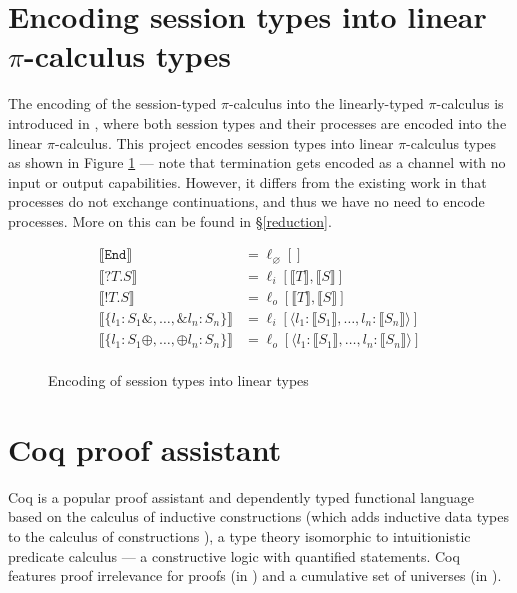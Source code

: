 \documentclass{mproj}
\newcommand{\picalc}{$\pi$-calculus}
\newcommand{\type}{\texttt}
\newcommand{\End}{\type{End}}
\newcommand{\Send}[1]{!#1.}
\newcommand{\Recv}[1]{?#1.}
\renewcommand{\emptyset}{\varnothing}
\newcommand{\encode}[1]{\llbracket #1 \rrbracket}
\begin{document}
\section{Encoding session types into linear \picalc{} types}
\label{continuation-passing}

The encoding of the session-typed \picalc{} into the linearly-typed \picalc{} is introduced in \cite{Kobayashi2003, Kobayashi2007, Dardha2017}, where both session types and their processes are encoded into the linear \picalc{}. This project encodes session types into linear \picalc{} types as shown in Figure \ref{session-to-linear-types} --- note that termination gets encoded as a channel with no input or output capabilities. However, it differs from the existing work in that processes do not exchange continuations, and thus we have no need to encode processes. More on this can be found in \S \ref{reduction}.

\begin{figure}[H]
    \begin{align*}
        \encode{\End}      &= \ell_\emptyset[]                  \\
        \encode{\Recv{T}S} &= \ell_i [ \encode{T}, \encode{S} ] \\
        \encode{\Send{T}S} &= \ell_o [ \encode{T}, \encode{S} ] \\
        \encode{\{l_1 : S_1 \&, \ldots, \&l_n : S_n\}} &= 
        \ell_i [\langle l_1 : \encode{S_1}, \ldots, l_n : \encode{S_n} \rangle] \\
        \encode{\{l_1 : S_1 \oplus, \ldots, \oplus l_n : S_n\}} &= 
        \ell_o [\langle l_1 : \encode{S_1}, \ldots, l_n : \encode{S_n} \rangle] \\
    \end{align*}
    \caption{Encoding of session types into linear types}
    \label{session-to-linear-types}
\end{figure}

\section{Coq proof assistant}\label{coq}

Coq \cite{CoqDeveloperCommunity} is a popular proof assistant and dependently typed functional language based on the calculus of inductive constructions \cite{Coquand1990} (which adds inductive data types to the calculus of constructions \cite{Coquand1985}), a type theory isomorphic to intuitionistic predicate calculus --- a constructive logic with quantified statements.  Coq features proof irrelevance for proofs (in ) and a cumulative set of universes (in ).
\end{document}
